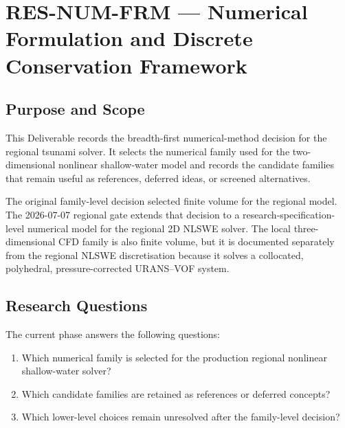 
\section{RES-NUM-FRM --- Numerical Formulation and Discrete Conservation Framework}
\label{sec:res-num-frm}

\subsection{Purpose and Scope}
\label{sec:res-num-frm-purpose}

This Deliverable records the breadth-first numerical-method decision
for the regional tsunami solver. It selects the numerical family used
for the two-dimensional nonlinear shallow-water model and records the
candidate families that remain useful as references, deferred ideas, or
screened alternatives.

The original family-level decision selected finite volume for the
regional model. The 2026-07-07 regional gate extends that decision to a
research-specification-level numerical model for the regional 2D NLSWE
solver. The local three-dimensional CFD family is also finite volume,
but it is documented separately from the regional NLSWE discretisation
because it solves a collocated, polyhedral, pressure-corrected
URANS--VOF system.

\subsection{Research Questions}
\label{sec:res-num-frm-research-questions}

The current phase answers the following questions:

\begin{enumerate}
  \item Which numerical family is selected for the production regional
    nonlinear shallow-water solver?
  \item Which candidate families are retained as references or
    deferred concepts?
  \item Which lower-level choices remain unresolved after the
    family-level decision?
\end{enumerate}

